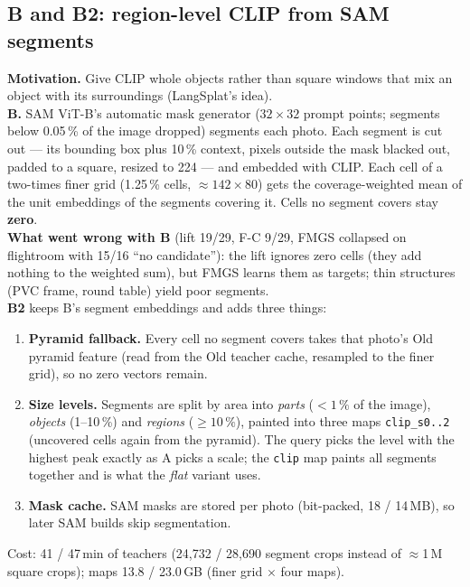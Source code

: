 \documentclass[11pt,a4paper]{article}
\newcommand{\code}[1]{\texttt{#1}}
\begin{document}
\subsection{B and B2: region-level CLIP from SAM segments}
\textbf{Motivation.} Give CLIP whole objects rather than square windows that mix an object with its surroundings
(LangSplat's idea).\\
\textbf{B.} SAM ViT-B's automatic mask generator ($32\times32$ prompt points; segments below 0.05\,\% of the image
dropped) segments each photo. Each segment is cut out --- its bounding box plus 10\,\% context, pixels outside the mask
blacked out, padded to a square, resized to 224 --- and embedded with CLIP. Each cell of a two-times finer grid
(1.25\,\% cells, $\approx142\times80$) gets the coverage-weighted mean of the unit embeddings of the segments covering it.
Cells no segment covers stay \textbf{zero}.\\
\textbf{What went wrong with B} (lift 19/29, F-C 9/29, FMGS collapsed on flightroom with 15/16 ``no candidate''): the
lift ignores zero cells (they add nothing to the weighted sum), but FMGS learns them as targets; thin structures (PVC
frame, round table) yield poor segments.\\
\textbf{B2} keeps B's segment embeddings and adds three things:
\begin{enumerate}
  \item \textbf{Pyramid fallback.} Every cell no segment covers takes that photo's Old pyramid feature (read from the
        Old teacher cache, resampled to the finer grid), so no zero vectors remain.
  \item \textbf{Size levels.} Segments are split by area into \emph{parts} ($<1\,\%$ of the image), \emph{objects}
        (1--10\,\%) and \emph{regions} ($\ge10\,\%$), painted into three maps \code{clip\_s0..2} (uncovered cells again
        from the pyramid). The query picks the level with the highest peak exactly as A picks a scale; the
        \code{clip} map paints all segments together and is what the \emph{flat} variant uses.
  \item \textbf{Mask cache.} SAM masks are stored per photo (bit-packed, 18 / 14\,MB), so later SAM builds skip
        segmentation.
\end{enumerate}
Cost: 41 / 47\,min of teachers (24{,}732 / 28{,}690 segment crops instead of $\approx$1\,M square crops); maps
13.8 / 23.0\,GB (finer grid $\times$ four maps).
\end{document}
